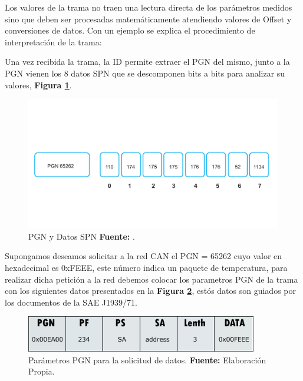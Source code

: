 Los valores de la trama no traen una lectura directa de los parámetros medidos sino que deben ser procesadas matemáticamente atendiendo valores de Offset y conversiones de datos.
Con un ejemplo se explica el procedimiento de interpretación de la trama:

Una vez recibida la trama, la ID permite extraer el PGN del mismo, junto a la PGN vienen los 8 datos SPN que se descomponen bits a bits para analizar su valores, \textbf{Figura \ref{TB3}}.

\begin{figure}[H]
	\centering
	\includegraphics[width=1\textwidth]{./Cap5imagen/PGNEJEM.pdf}
	\caption[PGN y Datos SPN.]{PGN y Datos SPN\textbf{ Fuente:} \cite{MCmi}.}
	\label{TB3} %
\end{figure}

Supongamos deseamos solicitar a la red CAN el PGN = 65262 cuyo valor en hexadecimal es 0xFEEE, este número indica un paquete de temperatura, para realizar dicha petición a la red debemos colocar los parametros PGN  de la trama con los siguientes datos presentados en la \textbf{Figura \ref{fig_pgndatos_c3}}, estós datos son guiados por los documentos de la SAE J1939/71. 

    \begin{figure}[H]
		\centering
		\includegraphics[width=0.9\textwidth]{./Cap3imagen/pgndatos.pdf}
		\caption[Parámetros PGN para la solicitud de datos.]{Parámetros PGN para la solicitud de datos.\textbf{ Fuente:} %
		Elaboración Propia.}
		\label{fig_pgndatos_c3} %
	\end{figure}

